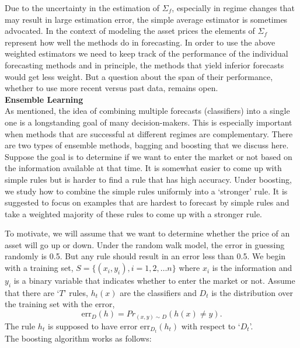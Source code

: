 \noindent Due to the uncertainty in the estimation of $\Sigma_f$, especially in regime changes that may result in large estimation error, the simple average estimator is sometimes advocated. In the context of modeling the asset prices the elements of $\Sigma_f$ represent how well the methods do in forecasting. In order to use the above weighted estimators we need to keep track of the performance of the individual forecasting methods and in principle, the methods that yield inferior forecasts would get less weight. But a question about the span of their performance, whether to use more recent versus past data, remains open. \\


\noindent \textbf{Ensemble Learning} \\


As mentioned, the idea of combining multiple forecasts (classifiers) into a single one is a longstanding goal of many decision-makers. This is especially important when methods that are successful at different regimes are complementary. There are two types of ensemble methods, bagging and boosting that we discuss here. Suppose the goal is to determine if we want to enter the market or not based on the information available at that time. It is somewhat easier to come up with simple rules but is harder to find a rule that has high accuracy. Under boosting, we study how to combine the simple rules uniformly into a `stronger' rule. It is suggested to focus on examples that are hardest to forecast by simple rules and take a weighted majority of these rules to come up with a stronger rule.


To motivate, we will assume that we want to determine whether the price of an asset will go up or down. Under the random walk model, the error in guessing randomly is 0.5. But any rule should result in an error less than 0.5. We begin with a training set, $S=\{ (x_i,y_i), i=1,2, \ldots n\}$ where $x_i$ is the information and $y_i$ is a binary variable that indicates whether to enter the market or not. Assume that there are `$T$' rules, $h_t(x)$ are the classifiers and $D_t$ is the distribution over the training set with the error,
	\begin{equation}
	\text{err}_D(h)=Pr_{(x,y) \sim D}(h(x) \neq y).
	\end{equation}
The rule $h_t$ is supposed to have error $\text{err}_{D_t}(h_t)$ with respect to `$D_t$'. \\


\noindent The boosting algorithm works as follows:


